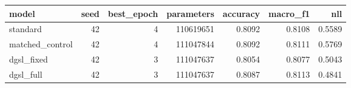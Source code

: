 \begin{tabular}{lrrrrrr}
\toprule
model & seed & best\_epoch & parameters & accuracy & macro\_f1 & nll \\
\midrule
standard & 42 & 4 & 110619651 & 0.8092 & 0.8108 & 0.5589 \\
matched\_control & 42 & 4 & 111047844 & 0.8092 & 0.8111 & 0.5769 \\
dgsl\_fixed & 42 & 3 & 111047637 & 0.8054 & 0.8077 & 0.5043 \\
dgsl\_full & 42 & 3 & 111047637 & 0.8087 & 0.8113 & 0.4841 \\
\bottomrule
\end{tabular}
